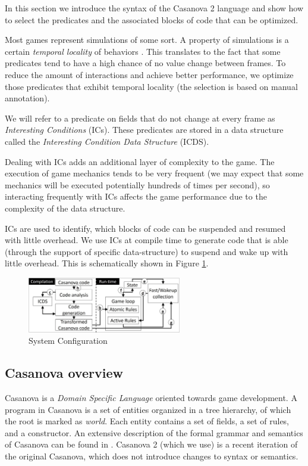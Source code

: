 In this section we introduce the syntax of the Casanova 2 language and show how to select the predicates and the associated blocks of code that can be optimized.

Most games represent simulations of some sort. A property of simulations is a certain \textit{temporal locality} of behaviors \cite{ai_dithering}. This translates to the fact that some predicates tend to have a high chance of no value change between frames. To reduce the amount of interactions and achieve better performance, we optimize those predicates that exhibit temporal locality (the selection is based on manual annotation).

We will refer to a predicate on fields that do not change at every frame as \textit{Interesting Conditions} (ICs). These predicates are stored in a data structure called the \textit{Interesting Condition Data Structure} (ICDS).

Dealing with ICs adds an additional layer of complexity to the game. The execution of game mechanics tends to be very frequent (we may expect that some mechanics will be executed potentially hundreds of times per second), so interacting frequently with ICs affects the game performance due to the complexity of the data structure.

ICs are used to identify, which blocks of code can be suspended and resumed with little overhead. We use ICs at compile time to generate code that is able (through the support of specific data-structure) to suspend and wake up with little overhead. This is schematically shown in Figure \ref{fig:system_configuration}.

\begin{figure}[!ht]
		\centering
         \includegraphics[width=0.6\textwidth]{Figures/system_description.jpg}
         \caption{System Configuration}
         \label{fig:system_configuration}
\end{figure}

\subsection{Casanova overview}
Casanova is a \textit{Domain Specific Language} oriented towards game development. A program in Casanova is a set of entities organized in a tree hierarchy, of which the root is marked as \textit{world}. Each entity contains a set of fields, a set of rules, and a constructor. An extensive description of the formal grammar and semantics of Casanova can be found in \cite{maggiore2013casanova}. Casanova 2 (which we use) is a recent iteration of the original Casanova, which does not introduce changes to syntax or semantics.


